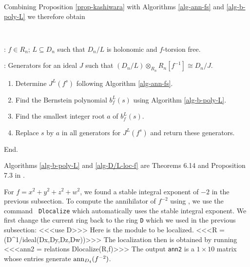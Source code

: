Combining Proposition \ref{prop-kashiwara} 
with Algorithms 
\ref{alg-ann-fs} 
and  
\ref{alg-b-poly-L} 
we therefore obtain
\begin{alg}[Localization]~

: 
 $f\in R_n$; $L\subseteq D_n$ such that $D_n/L$ is holonomic and
$f$-torsion free. 

: 
 Generators for an ideal $J$ such that $(D_n/L)\otimes_{R_n}
 R_n[f^{-1}]\cong D_n/J$.

\begin{enumerate}
\item Determine $J^L(f^s)$ following Algorithm \ref{alg-ann-fs}. 
\item Find the Bernstein polynomial $b_f^L(s)$ using Algorithm
\ref{alg-b-poly-L}. 
\item Find the smallest integer root $a$ of $b_f^L(s)$.
\item Replace $s$ by $a$ in all generators for $J^L(f^s)$ and
return these generators.
\end{enumerate}
End.
\end{alg}
Algorithms \ref{alg-b-poly-L} and \ref{alg-D/L-loc-f} are 
Theorems 6.14 and Proposition 7.3 in \cite{DM:Oa3}.

\begin{example}
For $f=x^2+y^2+z^2+w^2$, we found a stable integral exponent of $-2$
in the previous subsection.
To compute the annihilator of 
$f^{-2}$ using \Mtwo, we use the command {\tt
Dlocalize} which automatically uses the stable integral exponent.
We first change the current ring back to the ring {\tt D} which we used 
in the previous subsection:
<<<use D>>>
Here is the
module to be localized.
<<<R = (D^1/ideal(Dx,Dy,Dz,Dw))>>>
The localization then is obtained by running
<<<ann2 = relations Dlocalize(R,f)>>>
The output {\tt ann2} is a $1\times 10$ matrix whose entries generate
$\operatorname{ann}_{D_4}(f^{-2})$. 
\end{example}

